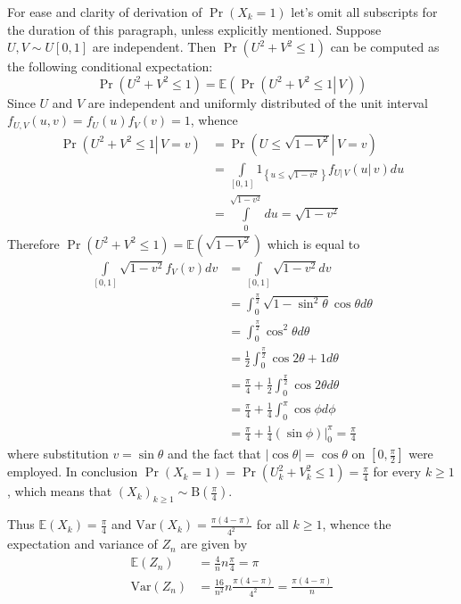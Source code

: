 \documentclass[a4paper]{article}
\newcommand{\obj}[1]{\left\{ #1 \right \}}
\newcommand{\clo}[1]{\left [ #1 \right ]}
\newcommand{\brac}[1]{\left ( #1 \right )}
\newcommand{\induc}[1]{\left . #1 \right \vert}
\newcommand{\abs}[1]{\left | #1 \right |}
\newcommand{\Ex}[1]{\mathbb{E}\brac{#1}}
\newcommand{\Var}[1]{\text{Var}\brac{#1}}
\begin{document}
For ease and clarity of derivation of $\Pr\brac{X_k=1}$ let's omit all subscripts for the duration of this paragraph, unless explicitly mentioned. Suppose $U,V\sim U\clo{0,1}$ are independent. Then $\Pr\brac{U^2+V^2\leq 1}$ can be computed as the following conditional expectation: \[\Pr\brac{U^2+V^2\leq 1} = \Ex{ \Pr\brac{\induc{U^2+V^2\leq 1}\,V} }\] Since $U$ and $V$ are independent and uniformly distributed of the unit interval $f_{U,V}\brac{u,v} = f_U\brac{u}f_V\brac{v}=1$, whence \begin{align*}
	\Pr\brac{\induc{U^2+V^2\leq 1}\,V=v} &= \Pr\brac{\induc{U\leq \sqrt{1-V^2}}\,V=v} \\ &= \int\limits_{\clo{0,1}} 1_{\obj{ u\leq \sqrt{1-v^2} }} f_{\induc{U}\,V}\brac{\induc{u}\,v} du \\ &= \int\limits_{0}^{\sqrt{1-v^2}} du = \sqrt{1-v^2}
\end{align*} Therefore $\Pr\brac{U^2+V^2\leq 1} = \Ex{ \sqrt{1-V^2} }$ which is equal to \begin{align*}
	\int\limits_{\clo{0,1}} \sqrt{1-v^2} f_V\brac{v} dv &= \int\limits_{\clo{0,1}} \sqrt{1-v^2} dv\\ &= \int_0^{\frac{\pi}{2}} \sqrt{ 1- \sin^2\theta } \cos\theta d\theta\\ &= \int_0^{\frac{\pi}{2}} \cos^2\theta d\theta\\ &= \frac{1}{2}\int_0^{\frac{\pi}{2}} \cos2\theta + 1 d\theta\\ &= \frac{\pi}{4}+\frac{1}{2}\int_0^{\frac{\pi}{2}} \cos2\theta d\theta\\ &= \frac{\pi}{4}+\frac{1}{4}\int_0^\pi \cos\phi d\phi \\ &= \frac{\pi}{4}+\frac{1}{4} \induc{\brac{\sin\phi}}_0^\pi =\frac{\pi}{4}
\end{align*} where substitution $v=\sin\theta$ and the fact that $\abs{\cos\theta}=\cos\theta$ on $\clo{0,\frac{\pi}{2}}$ were employed. In conclusion $\Pr\brac{X_k=1} = \Pr\brac{U_k^2+V_k^2\leq 1}=\frac{\pi}{4}$ for every $k\geq1$, which means that $\brac{X_k}_{k\geq1}\sim \text{B}\brac{\frac{\pi}{4}}$.

Thus $\Ex{X_k} = \frac{\pi}{4}$ and $\Var{X_k} = \frac{\pi\brac{4-\pi}}{4^2}$ for all $k\geq1$, whence the expectation and variance of $Z_n$ are given by \begin{align*}
	\Ex{Z_n} &= \frac{4}{n} n \frac{\pi}{4} = \pi\\
	\Var{Z_n} &= \frac{16}{n^2} n \frac{\pi\brac{4-\pi}}{4^2} = \frac{\pi\brac{4-\pi}}{n}\\
\end{align*}
\end{document}
